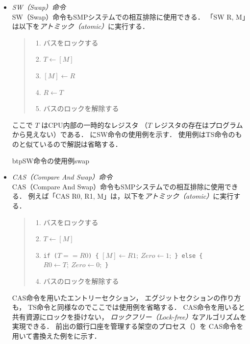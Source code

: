\begin{itemize}
\item \emph{SW（Swap）命令} \\
  SW（Swap）命令もSMPシステムでの相互排除に使用できる．
  「SW  R, M」は以下を\emph{アトミック（atomic）}に実行する．

  \begin{quote}
    \begin{enumerate}
    \item バスをロックする
    \item $T \leftarrow [M]$
    \item $[M] \leftarrow R$
    \item $R \leftarrow T$
    \item バスのロックを解除する
    \end{enumerate}
  \end{quote}

  ここで $T$ はCPU内部の一時的なレジスタ
  （$T$ レジスタの存在はプログラムから見えない）である．
  にSW命令の使用例を示す．
  使用例はTS命令のものと似ているので解説は省略する．

  \begin{myfig}{btp}{SW命令の使用例}{swap}
    
  \end{myfig}

\item \emph{CAS（Compare And Swap）命令}\\
  CAS（Compare And Swap）命令もSMPシステムでの相互排除に使用できる．
  例えば「CAS  R0, R1, M」は，以下を\emph{アトミック（atomic）}に実行する．

  \begin{quote}
    \begin{enumerate}
    \item バスをロックする
    \item $T \leftarrow [M]$
    \item \texttt{if ($T==R0$) \{} $[M] \leftarrow R1;~ Zero \leftarrow 1;$
      \texttt{\} else \{} $R0 \leftarrow T;~  Zero \leftarrow 0;$ \texttt{\}}
    \item バスのロックを解除する
    \end{enumerate}
  \end{quote}

  CAS命令を用いたエントリーセクション，
  エグジットセクションの作り方も，
  TS命令と同様なのでここでは使用例を省略する．
  CAS命令を用いると共有資源にロックを掛けない，
  \emph{ロックフリー（Lock-free）}なアルゴリズムを実現できる．
  前出の銀行口座を管理する架空のプロセス（）を
  CAS命令を用いて書換えた例をに示す．


\end{itemize}
